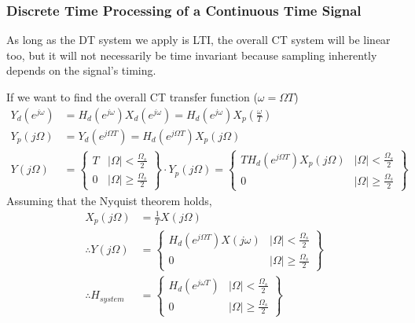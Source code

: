 \documentclass{article}
\begin{document}
\subsubsection{Discrete Time Processing of a Continuous Time Signal}
As long as the DT system we apply is LTI, the overall CT system will be linear too, but it will not necessarily be time invariant
because sampling inherently depends on the signal's timing.
\begin{figure}[H]
  \centering
\end{figure}
If we want to find the overall CT transfer function ($\omega = \Omega T$)
\begin{align*}
    Y_d(e^{j\omega}) &= H_d(e^{j\omega})X_d(e^{j\omega}) = H_d(e^{j\omega})X_p\left(\frac{\omega}{T}\right)\\
    Y_p(j\Omega) &= Y_d(e^{j\Omega T}) = H_d(e^{j\Omega T})X_p(j\Omega)\\
    Y(j\Omega) &= \left\{
        \begin{array}{cc}
            T & |\Omega| < \frac{\Omega_s}{2}\\
            0 & |\Omega| \ge \frac{\Omega_s}{2}
        \end{array}
        \right\} \cdot Y_p(j\Omega) = \left\{
            \begin{array}{cc}
                TH_d(e^{j\Omega T})X_p(j\Omega) & |\Omega| < \frac{\Omega_s}{2}\\
                0 & |\Omega| \ge \frac{\Omega_s}{2}
            \end{array}
            \right\}
\end{align*}
Assuming that the Nyquist theorem holds,
\begin{align*}
    X_p(j\Omega) &= \frac{1}{T}X(j\Omega)\\
    \therefore Y(j\Omega) &= \left\{
        \begin{array}{cc}
            H_d(e^{j\Omega T})X(j\omega) & |\Omega| < \frac{\Omega_s}{2}\\
            0 & |\Omega| \ge \frac{\Omega_s}{2}
        \end{array}
    \right\}\\
        \therefore H_{system} &= \left\{\begin{array}{cc}
            H_d(e^{j\omega T}) & |\Omega| < \frac{\Omega_s}{2}\\
            0 & |\Omega| \ge \frac{\Omega_s}{2}
        \end{array}
        \right\}
\end{align*}
\end{document}
